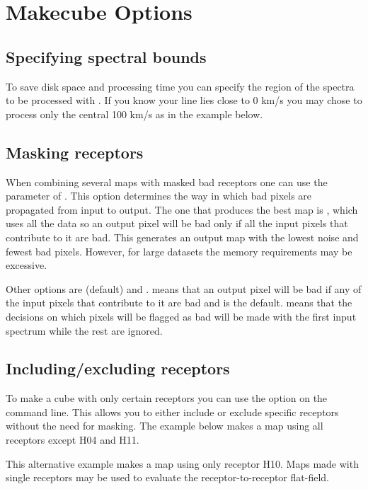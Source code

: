 \documentclass[11pt,oneside,chapters]{starlink}
\begin{document}
\section{Makecube Options}

\subsection{Specifying spectral bounds}

To save disk space and processing time you can specify the region of
the spectra to be processed with . If you know your
line lies close to 0 km/s you may chose to process only the central
100 km/s as in the example below.
\begin{terminalv}
\end{terminalv}

\subsection{Masking receptors}

When combining several maps with masked bad receptors one can use the
 parameter of \makecube. This option determines the way
in which bad pixels are propagated from input to output. The one that
produces the best map is , which uses all the data
so an output pixel will be bad only if all the input pixels that
contribute to it are bad. This generates an output map with the lowest
noise and fewest bad pixels. However, for large datasets the memory
requirements may be excessive.

Other options are  (default) and
.  means that an output pixel will be
bad if any of the input pixels that contribute to it are bad and is
the default.   means that the decisions on which pixels
will be flagged as bad will be made with the first input spectrum
while the rest are ignored.

\subsection{Including/excluding receptors}

To make a cube with only certain receptors you can use the
 option on the command line. This allows you to
either include or exclude specific receptors without the need for
masking. The example below makes a map using all receptors except H04
and H11.
\begin{terminalv}
\end{terminalv}
This alternative example makes a map using only receptor H10. Maps
made with single receptors may be used to evaluate the
receptor-to-receptor flat-field.
\begin{terminalv}
\end{terminalv}
\end{document}
